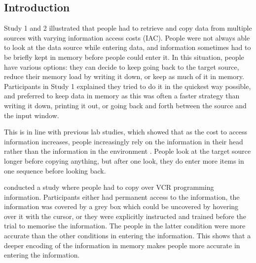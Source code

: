 \documentclass[11pt,oneside]{report}
\begin{document}
\subsection{Introduction}
Study 1 and 2 illustrated that people had to retrieve and copy data from multiple sources with varying information access costs (IAC). People were not always able to look at the data source while entering data, and information sometimes had to be briefly kept in memory before people could enter it.
In this situation, people have various options: they can decide to keep going back to the target source, reduce their memory load by writing it down, or keep as much of it in memory. Participants in Study 1 explained they tried to do it in the quickest way possible, and preferred to keep data in memory as this was often a faster strategy than writing it down, printing it out, or going back and forth between the source and the input window.

This is in line with previous lab studies, which showed that as the cost to access information increases, people increasingly rely on the information in their head rather than the information in the environment \citep[e.g.][]{Gray2006, Morgan2009}. People look at the target source longer before copying anything, but after one look, they do enter more items in one sequence before looking back. 

\citet{Gray2004} conducted a study where people had to copy over VCR programming information. Participants either had permanent access to the information, the information was covered by a grey box which could be uncovered by hovering over it with the cursor, or they were explicitly instructed and trained before the trial to memorise the information. The people in the latter condition were more accurate than the other conditions in entering the information. This shows that a deeper encoding of the information in memory makes people more accurate in entering the information. 
\end{document}
